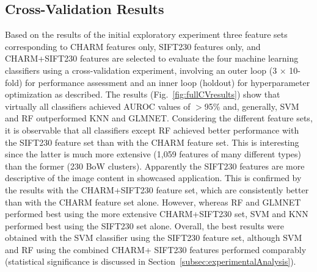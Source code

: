 \subsection{Cross-Validation Results}
\label{subsec:baselineResults}
Based on the results of the initial exploratory experiment three feature sets corresponding to CHARM features only, SIFT230 features only, and CHARM+SIFT230 features are selected to evaluate the four machine learning classifiers using a cross-validation experiment, involving an outer loop (3 $\times$ 10-fold) for performance assessment and an inner loop (holdout) for hyperparameter optimization as described. The results (Fig.~\ref{fig:fullCVresults}) show that virtually all classifiers achieved AUROC values of $>$95\% and, generally, SVM and RF outperformed KNN and GLMNET. Considering the different feature sets, it is observable that all classifiers except RF achieved better performance with the SIFT230 feature set than with the CHARM feature set. This is interesting since the latter is much more extensive (1,059 features of many different types) than the former (230 BoW clusters). Apparently the SIFT230 features are more descriptive of the image content in showcased application. This is confirmed by the results with the CHARM+SIFT230 feature set, which are consistently better than with the CHARM feature set alone. However, whereas RF and GLMNET performed best using the more extensive CHARM+SIFT230 set, SVM and KNN performed best using the SIFT230 set alone. Overall, the best results were obtained with the SVM classifier using the SIFT230 feature set, although SVM and RF using the combined CHARM+ SIFT230 features performed comparably (statistical significance is discussed in Section~\ref{subsec:experimentalAnalysis}).
